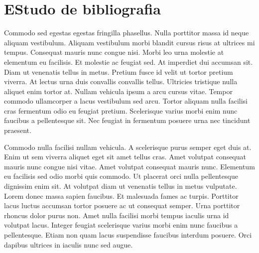 \documentclass[12pt]{article}
\begin{document}
				
				
	\newpage
	\section{EStudo de bibliografia}
		Commodo sed egestas egestas fringilla phasellus. Nulla porttitor massa id neque aliquam vestibulum. Aliquam vestibulum morbi blandit cursus risus at ultrices mi tempus. Consequat mauris nunc congue nisi. Morbi leo urna molestie at elementum eu facilisis. Et molestie ac feugiat sed. At imperdiet dui accumsan sit. Diam ut venenatis tellus in metus. Pretium fusce id velit ut tortor pretium viverra. At lectus urna duis convallis convallis tellus. Ultricies tristique nulla aliquet enim tortor at. Nullam vehicula ipsum a arcu cursus vitae. Tempor commodo ullamcorper a lacus vestibulum sed arcu. Tortor aliquam nulla facilisi cras fermentum odio eu feugiat pretium. Scelerisque varius morbi enim nunc faucibus a pellentesque sit. Nec feugiat in fermentum posuere urna nec tincidunt praesent.\textbf{\citeauthor{agr_machines}}
		
		Commodo nulla facilisi nullam vehicula. A scelerisque purus semper eget duis at. Enim ut sem viverra aliquet eget sit amet tellus cras. Amet volutpat consequat mauris nunc congue nisi vitae. Amet volutpat consequat mauris nunc. Elementum eu facilisis sed odio morbi quis commodo.\textbf{\cite{practical_eletronics}} Ut placerat orci nulla pellentesque dignissim enim sit. At volutpat diam ut venenatis tellus in metus vulputate. Lorem donec massa sapien faucibus. Et malesuada fames ac turpis. Porttitor lacus luctus accumsan tortor posuere ac ut consequat semper. Urna porttitor rhoncus dolor purus non. Amet nulla facilisi morbi tempus iaculis urna id volutpat lacus. Integer feugiat scelerisque varius morbi enim nunc faucibus a pellentesque. Etiam non quam lacus suspendisse faucibus interdum posuere. Orci dapibus ultrices in iaculis nunc sed augue.
	
	\newpage
	
	\nocite{alchemist_pauloc} %
\end{document}
